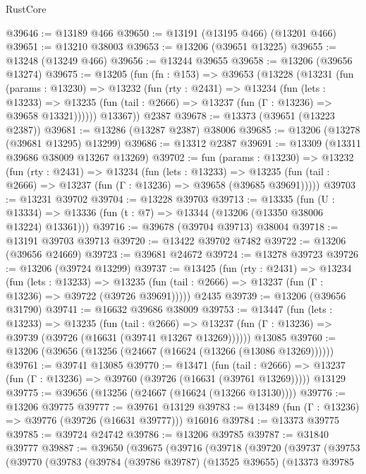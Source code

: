 \begin{lexlean}{RustCore}
\begin{coremodule}
@39646 := @13189 @466
@39650 := @13191 (@13195 @466) (@13201 @466)
@39651 := @13210 @38003
@39653 := @13206 (@39651 @13225)
@39655 := @13248 (@13249 @466)
@39656 := @13244 @39655
@39658 := @13206 (@39656 @13274)
@39675 := @13205
    (fun (fn : @153) =>
    @39653
      (@13228
        (@13231
          (fun (params : @13230) =>
          @13232
            (fun (rty : @2431) =>
            @13234
              (fun (lets : @13233) =>
              @13235 (fun (tail : @2666) => @13237 (fun (Γ : @13236) => @39658 @13321))))))
        @13367))
    @2387
@39678 := @13373 (@39651 (@13223 @2387))
@39681 := @13286 (@13287 @2387) @38006
@39685 := @13206 (@13278 (@39681 @13295) @13299)
@39686 := @13312 @2387
@39691 := @13309 (@13311 @39686 @38009 @13267 @13269)
@39702 := fun (params : @13230) =>
  @13232
    (fun (rty : @2431) =>
    @13234
      (fun (lets : @13233) =>
      @13235 (fun (tail : @2666) => @13237 (fun (Γ : @13236) => @39658 (@39685 @39691)))))
@39703 := @13231 @39702
@39704 := @13228 @39703
@39713 := @13335
    (fun (U : @13334) => @13336 (fun (t : @7) => @13344 (@13206 (@13350 @38006 @13224) @13361)))
@39716 := @39678 (@39704 @39713) @38004
@39718 := @13191 @39703 @39713
@39720 := @13422 @39702 @7482
@39722 := @13206 (@39656 @24669)
@39723 := @39681 @24672
@39724 := @13278 @39723
@39726 := @13206 (@39724 @13299)
@39737 := @13425
    (fun (rty : @2431) =>
    @13234
      (fun (lets : @13233) =>
      @13235 (fun (tail : @2666) => @13237 (fun (Γ : @13236) => @39722 (@39726 @39691)))))
    @2435
@39739 := @13206 (@39656 @31790)
@39741 := @16632 @39686 @38009
@39753 := @13447
    (fun (lets : @13233) =>
    @13235
      (fun (tail : @2666) =>
      @13237 (fun (Γ : @13236) => @39739 (@39726 (@16631 (@39741 @13267 @13269))))))
    @13085
@39760 := @13206 (@39656 (@13256 (@24667 (@16624 (@13266 (@13086 @13269))))))
@39761 := @39741 @13085
@39770 := @13471
    (fun (tail : @2666) => @13237 (fun (Γ : @13236) => @39760 (@39726 (@16631 (@39761 @13269)))))
    @13129
@39775 := @39656 (@13256 (@24667 (@16624 (@13266 @13130))))
@39776 := @13206 @39775
@39777 := @39761 @13129
@39783 := @13489 (fun (Γ : @13236) => @39776 (@39726 (@16631 @39777))) @16016
@39784 := @13373 @39775
@39785 := @39724 @24742
@39786 := @13206 @39785
@39787 := @31840 @39777
@39887 := @39650
    (@39675
      (@39716
        (@39718
          (@39720
            (@39737
              (@39753
                (@39770
                  (@39783
                    (@39784
                      (@39786 @39787)
                      (@13525 @39655)
                      (@13373
                        @39785

\end{coremodule}
\end{lexlean}
